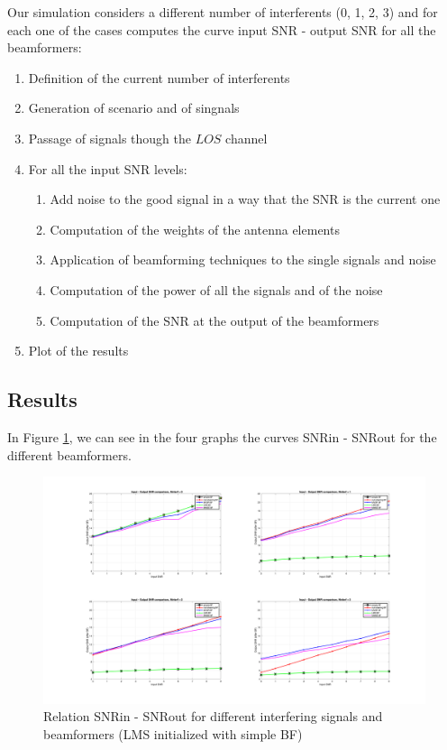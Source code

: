 Our simulation considers a different number of interferents (0, 1, 2, 3) and for each one of the cases computes the 
curve input SNR - output SNR for all the beamformers:

\begin{enumerate}
    \item Definition of the current number of interferents
    \item Generation of scenario and of singnals
    \item Passage of signals though the $LOS$ channel
    \item For all the input SNR levels:
    \begin{enumerate}
        \item Add noise to the good signal in a way that the SNR is the current one
        \item Computation of the weights of the antenna elements 
        \item Application of beamforming techniques to the single signals and noise
        \item Computation of the power of all the signals and of the noise
        \item Computation of the SNR at the output of the beamformers
    \end{enumerate}
    \item Plot of the results
\end{enumerate}

\subsection{Results}

In Figure \ref{fig:SNR_comparison}, we can see in the four graphs the curves SNRin - SNRout for the different
beamformers.

\begin{figure}[ht]
    \includegraphics[width=\linewidth]{SNR_comparison.png}  
    \caption{Relation SNRin - SNRout for different interfering signals and beamformers (LMS initialized with simple BF)}  
    \label{fig:SNR_comparison}
\end{figure}

